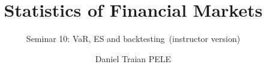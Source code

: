 \title[Statistics of Financial Markets]{Statistics of Financial Markets}
\subtitle{Seminar 10: VaR, ES and backtesting\ifsolutions\ (instructor version)\fi}
\author[D.T. Pele]{Daniel Traian PELE}
\date{}

\providecommand{\sfmapplink}[3]{\hypertarget{#2}{}\hyperlink{#1}{\beamergotobutton{#3}}}  %
\providecommand{\sfmappback}[2]{\begin{tikzpicture}[remember picture,overlay]\node[anchor=south east] at ([xshift=-3mm,yshift=7mm]current page.south east){\hyperlink{#1}{\beamerreturnbutton{#2}}};\end{tikzpicture}}  %
\providecommand{\sfmchlink}[2]{\href{#1}{#2}}  %
\providecommand{\sfmchlinkt}[2]{\href{#1}{\usebeamercolor[fg]{frametitle}#2}}  %


